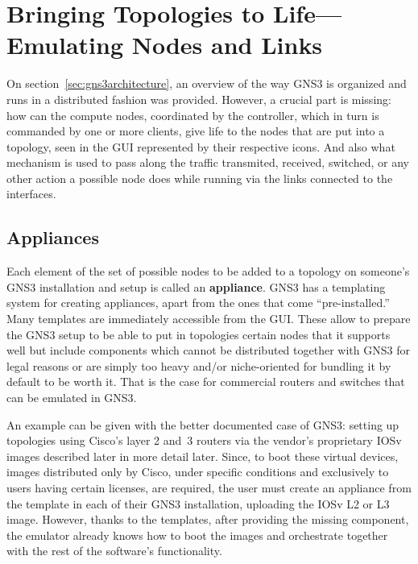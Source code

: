 \section{Bringing Topologies to Life---Emulating Nodes and Links}
\label{sec:gns3emulating}

On section~\ref{sec:gns3architecture}, an overview of the way GNS3 is organized and runs in a distributed fashion was provided.
However, a crucial part is missing: how can the compute nodes, coordinated by the controller, which in turn is commanded by one or more clients, give life to the nodes that are put into a topology, seen in the GUI represented by their respective icons.
And also what mechanism is used to pass along the traffic transmited, received, switched, or any other action a possible node does while running via the links connected to the interfaces.

\subsection{Appliances}
\label{subsec:gns3appliances}

Each element of the set of possible nodes to be added to a topology on someone's GNS3 installation and setup is called an \textbf{appliance}.
GNS3 has a templating system for creating appliances, apart from the ones that come ``pre-installed.''
Many templates are immediately accessible from the GUI.
These allow to prepare the GNS3 setup to be able to put in topologies certain nodes that it supports well but include components which cannot be distributed together with GNS3 for legal reasons or are simply too heavy and/or niche-oriented for bundling it by default to be worth it.
That is the case for commercial routers and switches that can be emulated in GNS3.

An example can be given with the better documented case of GNS3: setting up topologies using Cisco's layer 2 and~3 routers via the vendor's proprietary IOSv images described later in more detail later.
Since, to boot these virtual devices, images distributed only by Cisco, under specific conditions and exclusively to users having certain licenses, are required, the user must create an appliance from the template in each of their GNS3 installation, uploading the IOSv L2 or L3 image.
However, thanks to the templates, after providing the missing component, the emulator already knows how to boot the images and orchestrate together with the rest of the software's functionality.


